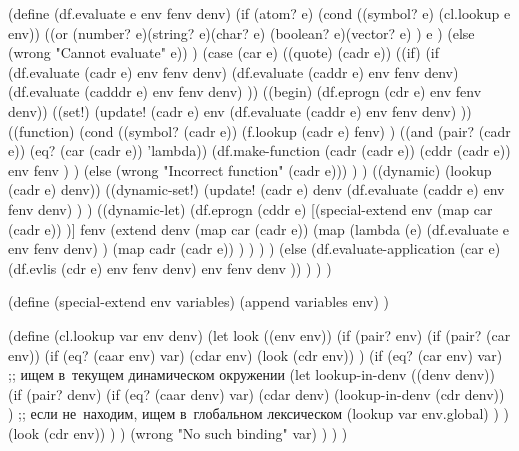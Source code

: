 \begin{code:lisp}
(define (df.evaluate e env fenv denv)
  (if (atom? e)
      (cond ((symbol? e) (cl.lookup e env))
            ((or (number? e)(string? e)(char? e)
                 (boolean? e)(vector? e) )
             e )
            (else (wrong "Cannot evaluate" e)) )
      (case (car e)
        ((quote)  (cadr e))
        ((if)     (if (df.evaluate (cadr e) env fenv denv)
                      (df.evaluate (caddr e) env fenv denv)
                      (df.evaluate (cadddr e) env fenv denv) ))
        ((begin)  (df.eprogn (cdr e) env fenv denv))
        ((set!)   (update! (cadr e)
                           env
                           (df.evaluate (caddr e) env fenv denv) ))
        ((function)
         (cond ((symbol? (cadr e))
                (f.lookup (cadr e) fenv) )
               ((and (pair? (cadr e)) (eq? (car (cadr e)) 'lambda))
                (df.make-function
                 (cadr (cadr e)) (cddr (cadr e)) env fenv ) )
               (else (wrong "Incorrect function" (cadr e))) ) )
        ((dynamic) (lookup (cadr e) denv))
        ((dynamic-set!)
         (update! (cadr e)
                  denv
                  (df.evaluate (caddr e) env fenv denv) ) )
        ((dynamic-let)
         (df.eprogn (cddr e)
                    [(special-extend env
                                    (map car (cadr e)) )]
                    fenv
                    (extend denv
                            (map car (cadr e))
                            (map (lambda (e)
                                   (df.evaluate e env fenv denv) )
                                 (map cadr (cadr e)) ) ) ) )
        (else (df.evaluate-application (car e)
                                       (df.evlis (cdr e) env fenv denv)
                                       env
                                       fenv
                                       denv )) ) ) )

(define (special-extend env variables)
  (append variables env) )

(define (cl.lookup var env denv)
  (let look ((env env))
    (if (pair? env)
        (if (pair? (car env))
            (if (eq? (caar env) var)
                (cdar env)
                (look (cdr env)) )
            (if (eq? (car env) var)
                ;; ищем в~текущем динамическом окружении
                (let lookup-in-denv ((denv denv))
                  (if (pair? denv)
                      (if (eq? (caar denv) var)
                          (cdar denv)
                          (lookup-in-denv (cdr denv)) )
                      ;; если не~находим, ищем в~глобальном лексическом
                      (lookup var env.global) ) )
                (look (cdr env)) ) )
        (wrong "No such binding" var) ) ) )
\end{code:lisp}

